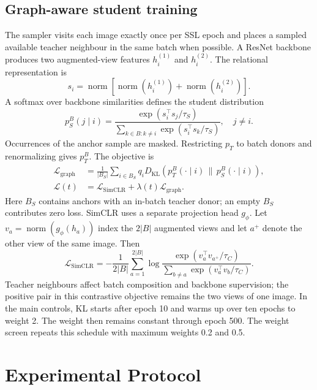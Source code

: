 \documentclass[11pt,a4paper]{article}
\begin{document}
\subsection{Graph-aware student training}
The sampler visits each image exactly once per SSL epoch and places a sampled
available teacher neighbour in the same batch when possible. A ResNet backbone
produces two augmented-view features $h_i^{(1)}$ and $h_i^{(2)}$. The relational
representation is
\begin{equation}
 s_i=\operatorname{norm}\!\left[\operatorname{norm}(h_i^{(1)})+
 \operatorname{norm}(h_i^{(2)})\right].
\end{equation}
A softmax over backbone similarities defines the student distribution
\begin{equation}
 p_S^B(j\mid i)=\frac{\exp(s_i^\top s_j/\tau_S)}
 {\sum_{k\in B:k\ne i}\exp(s_i^\top s_k/\tau_S)},\quad j\ne i.
\end{equation} Occurrences of the anchor sample are masked. Restricting
$p_T$ to batch donors and renormalizing gives $p_T^B$. The objective is
\begin{align}
 \mathcal{L}_{\mathrm{graph}}&=\frac{1}{|B_S|}\sum_{i\in B_S}q_i
 D_{\mathrm{KL}}\!\left(p_T^B(\cdot\mid i)\,\|\,p_S^B(\cdot\mid i)\right),\\
 \mathcal{L}(t)&=\mathcal{L}_{\mathrm{SimCLR}}+
 \lambda(t)\mathcal{L}_{\mathrm{graph}}.
\end{align}
Here $B_S$ contains anchors with an in-batch teacher donor; an empty $B_S$
contributes zero loss. SimCLR uses a separate projection head $g_\phi$.
Let $v_a=\operatorname{norm}(g_\phi(h_a))$ index the $2|B|$ augmented views
and let $a^+$ denote the other view of the same image. Then
\begin{equation}
 \mathcal{L}_{\mathrm{SimCLR}}=-\frac{1}{2|B|}\sum_{a=1}^{2|B|}
 \log\frac{\exp(v_a^\top v_{a^+}/\tau_C)}
 {\sum_{b\ne a}\exp(v_a^\top v_b/\tau_C)}.
\end{equation}
Teacher neighbours affect batch composition and backbone supervision; the
positive pair in this contrastive objective remains the two views of one image.
In the main controls, KL starts after epoch 10 and warms up over ten epochs
to weight 2. The weight then remains constant through epoch 500. The weight
screen repeats this schedule with maximum weights 0.2 and 0.5.

\section{Experimental Protocol}
\end{document}
